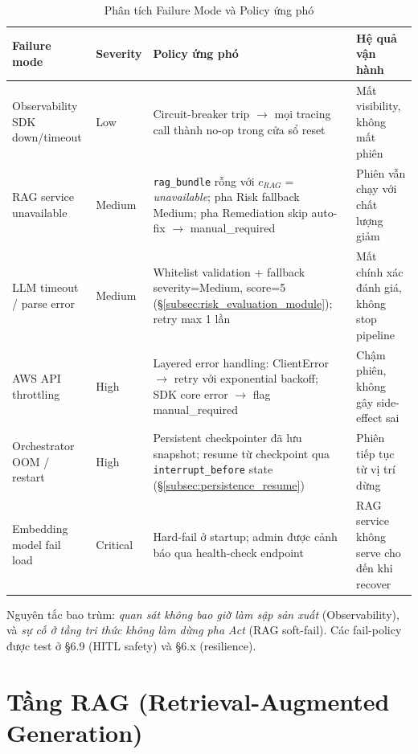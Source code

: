 \begin{table}[!htb]
  \centering
  \caption{Phân tích Failure Mode và Policy ứng phó}
  \label{tab:failure_modes}
  \renewcommand{\arraystretch}{1.25}
  \footnotesize
  \begin{tabular}{|p{2.6cm}|p{2.4cm}|p{4.0cm}|p{3.4cm}|}
    \hline
    \textbf{Failure mode} & \textbf{Severity} & \textbf{Policy ứng phó} & \textbf{Hệ quả vận hành} \\ \hline
    Observability SDK down/timeout & Low & Circuit-breaker trip $\rightarrow$ mọi tracing call thành no-op trong cửa sổ reset & Mất visibility, không mất phiên \\ \hline
    RAG service unavailable & Medium & \texttt{rag\_bundle} rỗng với $c_{RAG}=$\textit{unavailable}; pha Risk fallback Medium; pha Remediation skip auto-fix $\rightarrow$ manual\_required & Phiên vẫn chạy với chất lượng giảm \\ \hline
    LLM timeout / parse error & Medium & Whitelist validation + fallback severity=Medium, score=5 (\S\ref{subsec:risk_evaluation_module}); retry max 1 lần & Mất chính xác đánh giá, không stop pipeline \\ \hline
    AWS API throttling & High & Layered error handling: ClientError $\to$ retry với exponential backoff; SDK core error $\to$ flag manual\_required & Chậm phiên, không gây side-effect sai \\ \hline
    Orchestrator OOM / restart & High & Persistent checkpointer đã lưu snapshot; resume từ checkpoint qua \texttt{interrupt\_before} state (\S\ref{subsec:persistence_resume}) & Phiên tiếp tục từ vị trí dừng \\ \hline
    Embedding model fail load & Critical & Hard-fail ở startup; admin được cảnh báo qua health-check endpoint & RAG service không serve cho đến khi recover \\ \hline
  \end{tabular}
\end{table}

Nguyên tắc bao trùm: \textit{quan sát không bao giờ làm sập sản xuất} (Observability), và \textit{sự cố ở tầng tri thức không làm dừng pha Act} (RAG soft-fail). Các fail-policy được test ở \S{}6.9 (HITL safety) và \S{}6.x (resilience).

\section{Tầng RAG (Retrieval-Augmented Generation)}
\label{sec:rag_layer}

